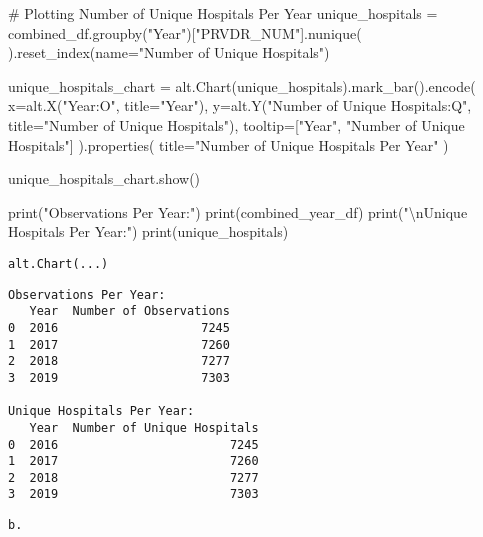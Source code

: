 \documentclass[
  letterpaper,
  DIV=11,
  numbers=noendperiod]{scrartcl}
\newenvironment{Shaded}{\begin{snugshade}}{\end{snugshade}}
\newcommand{\BuiltInTok}[1]{\textcolor[rgb]{0.00,0.23,0.31}{#1}}
\newcommand{\CharTok}[1]{\textcolor[rgb]{0.13,0.47,0.30}{#1}}
\newcommand{\CommentTok}[1]{\textcolor[rgb]{0.37,0.37,0.37}{#1}}
\newcommand{\NormalTok}[1]{\textcolor[rgb]{0.00,0.23,0.31}{#1}}
\newcommand{\OperatorTok}[1]{\textcolor[rgb]{0.37,0.37,0.37}{#1}}
\newcommand{\StringTok}[1]{\textcolor[rgb]{0.13,0.47,0.30}{#1}}
\begin{document}
\begin{Shaded}
\begin{Highlighting}[]
\CommentTok{\# Plotting Number of Unique Hospitals Per Year}
\NormalTok{unique\_hospitals }\OperatorTok{=}\NormalTok{ combined\_df.groupby(}\StringTok{"Year"}\NormalTok{)[}\StringTok{"PRVDR\_NUM"}\NormalTok{].nunique(}
\NormalTok{).reset\_index(name}\OperatorTok{=}\StringTok{"Number of Unique Hospitals"}\NormalTok{)}

\NormalTok{unique\_hospitals\_chart }\OperatorTok{=}\NormalTok{ alt.Chart(unique\_hospitals).mark\_bar().encode(}
\NormalTok{    x}\OperatorTok{=}\NormalTok{alt.X(}\StringTok{"Year:O"}\NormalTok{, title}\OperatorTok{=}\StringTok{"Year"}\NormalTok{),}
\NormalTok{    y}\OperatorTok{=}\NormalTok{alt.Y(}\StringTok{"Number of Unique Hospitals:Q"}\NormalTok{,}
\NormalTok{            title}\OperatorTok{=}\StringTok{"Number of Unique Hospitals"}\NormalTok{),}
\NormalTok{    tooltip}\OperatorTok{=}\NormalTok{[}\StringTok{"Year"}\NormalTok{, }\StringTok{"Number of Unique Hospitals"}\NormalTok{]}
\NormalTok{).properties(}
\NormalTok{    title}\OperatorTok{=}\StringTok{"Number of Unique Hospitals Per Year"}
\NormalTok{)}

\NormalTok{unique\_hospitals\_chart.show()}

\BuiltInTok{print}\NormalTok{(}\StringTok{"Observations Per Year:"}\NormalTok{)}
\BuiltInTok{print}\NormalTok{(combined\_year\_df)}
\BuiltInTok{print}\NormalTok{(}\StringTok{"}\CharTok{\textbackslash{}n}\StringTok{Unique Hospitals Per Year:"}\NormalTok{)}
\BuiltInTok{print}\NormalTok{(unique\_hospitals)}
\end{Highlighting}
\end{Shaded}

\begin{verbatim}
alt.Chart(...)
\end{verbatim}

\begin{verbatim}
Observations Per Year:
   Year  Number of Observations
0  2016                    7245
1  2017                    7260
2  2018                    7277
3  2019                    7303

Unique Hospitals Per Year:
   Year  Number of Unique Hospitals
0  2016                        7245
1  2017                        7260
2  2018                        7277
3  2019                        7303
\end{verbatim}

\begin{verbatim}
b. 
\end{verbatim}
\end{document}
